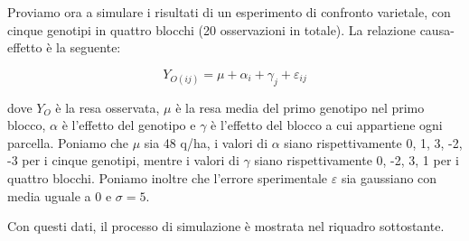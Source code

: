 \documentclass[
  12pt,
]{book}
\begin{document}
Proviamo ora a simulare i risultati di un esperimento di confronto varietale, con cinque genotipi in quattro blocchi (20 osservazioni in totale). La relazione causa-effetto è la seguente:

\[Y_{O(ij)} = \mu + \alpha_i + \gamma_j + \varepsilon_{ij}\]

dove \(Y_O\) è la resa osservata, \(\mu\) è la resa media del primo genotipo nel primo blocco, \(\alpha\) è l'effetto del genotipo e \(\gamma\) è l'effetto del blocco a cui appartiene ogni parcella. Poniamo che \(\mu\) sia 48 q/ha, i valori di \(\alpha\) siano rispettivamente 0, 1, 3, -2, -3 per i cinque genotipi, mentre i valori di \(\gamma\) siano rispettivamente 0, -2, 3, 1 per i quattro blocchi. Poniamo inoltre che l'errore sperimentale \(\varepsilon\) sia gaussiano con media uguale a 0 e \(\sigma = 5\).

Con questi dati, il processo di simulazione è mostrata nel riquadro sottostante.

\small
\vspace{12pt}
\end{document}
